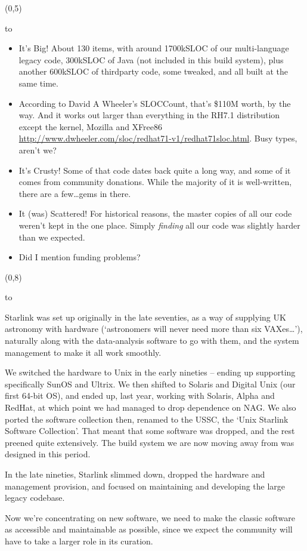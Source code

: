 \documentclass[a0,portrait]{a0poster-ng}
\def\RHead#1{\noindent\hbox to \hsize{\hfil{\LARGE\color{DarkBlue} #1\par}}\bigskip}
\let\Head\RHead
\begin{document}
\begin{textblock}{7}(0,5)

\Head{The problems}

\begin{itemize}
\item It's Big!  About 130 items, with around 1700kSLOC of our
  multi-language legacy code, 300kSLOC of Java (not included in
  this build system), plus another 600kSLOC of thirdparty code, some
  tweaked, and all built at the same time.

\item According to David A Wheeler's SLOCCount,
  that's \$110M worth, by the way.  And it works out larger than
  everything in the RH7.1 distribution except the kernel, Mozilla and XFree86
  \url{http://www.dwheeler.com/sloc/redhat71-v1/redhat71sloc.html}.
  Busy types, aren't we?

\item It's Crusty!  Some of that code dates back quite a long way, and
  some of it comes from community donations.  While the majority of it
  is well-written, there are a few\dots gems in there.

\item It (was) Scattered!  For historical reasons, the master copies
  of all our code weren't kept in the one place.  Simply
  \emph{finding} all our code was slightly harder than we expected.

\item Did I mention funding problems?

\end{itemize}
\end{textblock}


\begin{textblock}{7}(0,8)

\Head{History}

Starlink was set up originally in the late seventies, as a way of
supplying UK astronomy with hardware (`astronomers will never need
more than six VAXes\dots'), naturally along with the data-analysis
software to go with them, and the system management to make it all
work smoothly.

We switched the hardware to Unix in the early nineties -- ending up
supporting specifically SunOS and Ultrix.  We then shifted to Solaris
and Digital Unix (our first 64-bit OS), and ended up, last year,
working with Solaris, Alpha and RedHat, at which point we had managed
to drop dependence on NAG.  We also ported the software
collection then, renamed to the USSC, the `Unix Starlink Software
Collection'.  That meant that some software was dropped, and the rest
preened quite extensively.  The build system we are now moving away
from was designed in this period.

In the late nineties, Starlink slimmed down, dropped the hardware and
management provision, and focused on maintaining and developing the
large legacy codebase.

Now we're concentrating on new software, we need to make the classic
software as accessible and maintainable as possible, since we expect
the community will have to take a larger role in its curation.

\end{textblock}
\end{document}
